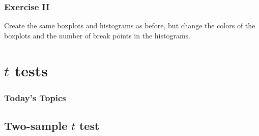 \documentclass[color=usenames,dvipsnames]{beamer}\usepackage[]{graphicx}\usepackage[]{color}
\begin{document}
\begin{frame}[fragile]
  \frametitle{Exercise II}
  \centering
  \Large
      Create the same boxplots and histograms as before, but
      change the colors of the boxplots and the number of break points in
      the histograms. \par
\end{frame}



\section{$t$ tests}




\begin{frame}[plain]
  \frametitle{Today's Topics}
  \Large
\end{frame}



\subsection{Two-sample $t$ test}



\begin{comment}
\begin{frame}
  \frametitle{Conceptual Example}
  \begin{itemize}
    \item The (unknown) population means are:
      \begin{itemize}
        \item $\mu_A = 5$
        \item $\mu_B = 7$
      \end{itemize}
    \item Both populations have variance $\sigma^2 = 4$.
    \item We collect 2 samples, each with $n=15$
    \item The sample means are:
      \begin{itemize}
        \item $\bar{y_1}$
      \end{itemize}
  \end{itemize}
\end{frame}
\end{comment}
\end{document}
